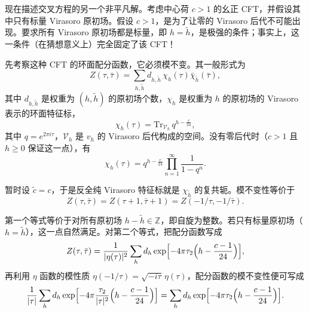 现在描述交叉方程的另一个非平凡解。考虑中心荷 $c>1$ 的幺正 CFT，并假设其中只有标量 Virasoro 原初场。假设 $c>1$，是为了让零的 Virasoro 后代不可能出现。要求所有 Virasoro 原初场都是标量，即 $h=\tilde h$，是极强的条件；事实上，这一条件（在猜想意义上）完全固定了该 CFT！

先考察这种 CFT 的环面配分函数，它必须模不变。其一般形式为
\begin{equation}\label{eq:3-48}
  Z(\tau,\bar\tau)=\sum_{h,\tilde h}d_{h,\tilde h}\,
  \chi_h(\tau)\bar\chi_{\tilde h}(\bar\tau),
\end{equation}
其中 $d_{h,\tilde h}$ 是权重为 $(h,\tilde h)$ 的原初场个数，$\chi_h$ 是权重为 $h$ 的原初场的 Virasoro 表示的环面特征标，
\begin{equation}\label{eq:3-49}
  \chi_h(\tau)=\mathrm{Tr}_{\mathcal{V}_h}\,q^{h-\frac{c}{24}},
\end{equation}
其中 $q=e^{2\pi i\tau}$，$\mathcal{V}_h$ 是 $v_h$ 的 Virasoro 后代构成的空间。没有零后代时（$c>1$ 且 $h\ge0$ 保证这一点），有
\begin{equation}\label{eq:3-50}
  \chi_h(\tau)=q^{h-\frac{c}{24}}\prod_{n=1}^{\infty}\frac{1}{1-q^n}.
\end{equation}


暂时设 $\tilde c=c$，于是反全纯 Virasoro 特征标就是 $\chi_{\tilde h}$ 的复共轭。模不变性等价于
\begin{equation}\label{eq:3-51}
  Z(\tau,\bar\tau)=Z(\tau+1,\bar\tau+1)=Z(-1/\tau,-1/\bar\tau).
\end{equation}

第一个等式等价于对所有原初场 $h-\tilde h\in\mathbb{Z}$，即自旋为整数。若只有标量原初场（$h=\tilde h$），这一点自然满足。对第二个等式，把配分函数写成
\begin{equation}\label{eq:3-52}
  Z(\tau,\bar\tau)=\frac{1}{|\eta(\tau)|^2}
  \sum_h d_h\exp\Bigl[-4\pi\tau_2\Bigl(h-\frac{c-1}{24}\Bigr)\Bigr],
\end{equation}
再利用 $\eta$ 函数的模性质 $\eta(-1/\tau)=\sqrt{-i\tau}\,\eta(\tau)$，配分函数的模不变性便可写成
\begin{equation}\label{eq:3-53}
  \frac{1}{|\tau|}\sum_h d_h
  \exp\Bigl[-4\pi\frac{\tau_2}{|\tau|^2}\Bigl(h-\frac{c-1}{24}\Bigr)\Bigr]
  =\sum_h d_h\exp\Bigl[-4\pi\tau_2\Bigl(h-\frac{c-1}{24}\Bigr)\Bigr].
\end{equation}

